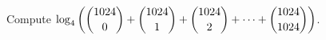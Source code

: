 Compute $\log_4\left(\dbinom{1024}{0}+\dbinom{1024}{1}+\dbinom{1024}{2}+\cdots+\dbinom{1024}{1024}\right)$.
